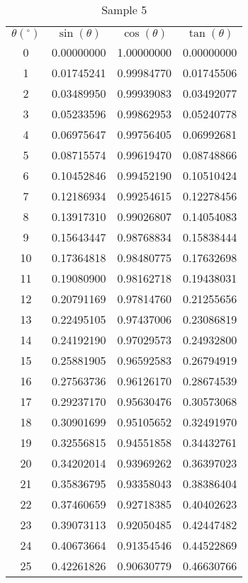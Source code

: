 \documentclass{jsarticle}
\begin{document}
\begin{longtable}{|c|c|c|c|}
	\captionsetup{labelformat=empty,labelsep=none}
	\caption{Sample 5}
	\label{sample5}
	\\ \hline\centering
	$\theta(^\circ)$	&$\sin(\theta)$	&$\cos(\theta)$	&$\tan(\theta)$	\\ \hline\endhead
	0	&0.00000000	&1.00000000	&0.00000000	\\ \hline
	1	&0.01745241	&0.99984770	&0.01745506	\\ \hline
	2	&0.03489950	&0.99939083	&0.03492077	\\ \hline
	3	&0.05233596	&0.99862953	&0.05240778	\\ \hline
	4	&0.06975647	&0.99756405	&0.06992681	\\ \hline
	5	&0.08715574	&0.99619470	&0.08748866	\\ \hline
	6	&0.10452846	&0.99452190	&0.10510424	\\ \hline
	7	&0.12186934	&0.99254615	&0.12278456	\\ \hline
	8	&0.13917310	&0.99026807	&0.14054083	\\ \hline
	9	&0.15643447	&0.98768834	&0.15838444	\\ \hline
	10	&0.17364818	&0.98480775	&0.17632698	\\ \hline
	11	&0.19080900	&0.98162718	&0.19438031	\\ \hline
	12	&0.20791169	&0.97814760	&0.21255656	\\ \hline
	13	&0.22495105	&0.97437006	&0.23086819	\\ \hline
	14	&0.24192190	&0.97029573	&0.24932800	\\ \hline
	15	&0.25881905	&0.96592583	&0.26794919	\\ \hline
	16	&0.27563736	&0.96126170	&0.28674539	\\ \hline
	17	&0.29237170	&0.95630476	&0.30573068	\\ \hline
	18	&0.30901699	&0.95105652	&0.32491970	\\ \hline
	19	&0.32556815	&0.94551858	&0.34432761	\\ \hline
	20	&0.34202014	&0.93969262	&0.36397023	\\ \hline
	21	&0.35836795	&0.93358043	&0.38386404	\\ \hline
	22	&0.37460659	&0.92718385	&0.40402623	\\ \hline
	23	&0.39073113	&0.92050485	&0.42447482	\\ \hline
	24	&0.40673664	&0.91354546	&0.44522869	\\ \hline
	25	&0.42261826	&0.90630779	&0.46630766	\\ \hline

\end{longtable}
\end{document}
